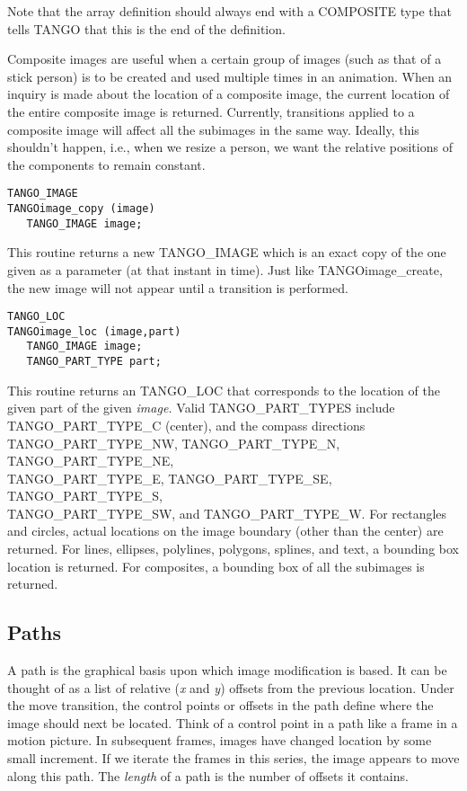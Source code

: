 Note that the array definition should always end with a COMPOSITE type that
tells TANGO that this is the end of the definition.

Composite images are useful when a certain group of images (such as that of a
stick person) is to be created and used multiple times in an animation.  When
an inquiry is made about the location of a composite image, the current
location of the entire composite image is returned.  Currently, transitions
applied to a composite image will affect all the subimages in the same
way. Ideally, this shouldn't happen, i.e., when we resize a person, we want
the relative positions of the components to remain constant.

\vspace{1em}
\begin{verbatim}
TANGO_IMAGE
TANGOimage_copy (image) 
   TANGO_IMAGE image;
\end{verbatim}
This routine returns a new TANGO\_IMAGE which is an exact copy of the
one given as a parameter (at that instant in time).  Just like
TANGOimage\_create, the new image will not appear until a transition is
performed. 

\vspace{1em}
\begin{verbatim}
TANGO_LOC
TANGOimage_loc (image,part) 
   TANGO_IMAGE image;
   TANGO_PART_TYPE part;
\end{verbatim}
This routine returns an TANGO\_LOC that corresponds to the location of
the given part of the given {\em image. } Valid TANGO\_PART\_TYPES
include TANGO\_PART\_TYPE\_C (center), and the compass directions
TANGO\_PART\_TYPE\_NW, TANGO\_PART\_TYPE\_N, TANGO\_PART\_TYPE\_NE,\\
TANGO\_PART\_TYPE\_E, TANGO\_PART\_TYPE\_SE, TANGO\_PART\_TYPE\_S,\\
TANGO\_PART\_TYPE\_SW, and TANGO\_PART\_TYPE\_W.  For rectangles and
circles, actual locations on the image boundary (other than the center) are
returned.  For lines, ellipses, polylines, polygons, splines, and
text, a bounding box location is returned.  For composites, a bounding
box of all the subimages is returned.

\subsection{Paths}
A path is the graphical basis upon which image modification is based.  It can
be thought of as a list of relative ({\em x} and {\em y}) offsets from the
previous location.  Under the move transition, the control points or offsets
in the path define where the image should next be located.  Think of a control
point in a path like a frame in a motion picture.  In subsequent frames,
images have changed location by some small increment.  If we iterate the
frames in this series, the image appears to move along this path.  The
{\em length} of a path is the number of offsets it contains.

